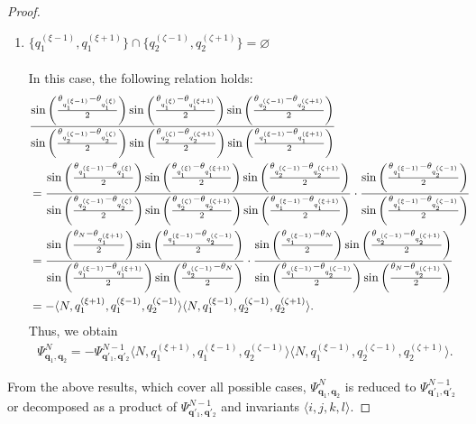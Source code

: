 \documentclass[
amsmath,amssymb,
]{revtex4-2}
\begin{document}
\begin{proof}
\begin{enumerate}
\item[\textit{Case.6:}] $\{{q_1^{(\xi-1)}},{q_1^{(\xi+1)}}\} \cap \{{q_2^{(\zeta-1)}}, {q_2^{(\zeta+1)}}\} = \varnothing$ 
\\ \\
%
In this case, the following relation holds:
\begin{align}
    &\frac{\sin\left( \frac{\theta_{q_1^{(\xi-1)}} - \theta_{q_1^{(\xi)}}}{2} \right)\sin\left( \frac{\theta_{q_1^{(\xi)}} - \theta_{q_1^{(\xi+1)}}}{2} \right)\sin\left( \frac{\theta_{q_2^{(\zeta-1)}} - \theta_{q_2^{(\zeta+1)}}}{2} \right)}
   {\sin\left( \frac{\theta_{q_2^{(\zeta-1)}} - \theta_{q_2^{(\zeta)}}}{2} \right)\sin\left( \frac{\theta_{q_2^{(\zeta)}} - \theta_{q_2^{(\zeta+1)}}}{2} \right)\sin\left( \frac{\theta_{q_1^{(\xi-1)}} - \theta_{q_1^{(\xi+1)}}}{2} \right)}\cr
    &=\frac{\sin\left( \frac{\theta_{q_1^{(\xi-1)}} - \theta_{q_1^{(\xi)}}}{2} \right)\sin\left( \frac{\theta_{q_1^{(\xi)}} - \theta_{q_1^{(\xi+1)}}}{2} \right)\sin\left( \frac{\theta_{q_2^{(\zeta-1)}} - \theta_{q_2^{(\zeta+1)}}}{2} \right)}
   {\sin\left( \frac{\theta_{q_2^{(\zeta-1)}} - \theta_{q_2^{(\zeta)}}}{2} \right)\sin\left( \frac{\theta_{q_2^{(\zeta)}} - \theta_{q_2^{(\zeta+1)}}}{2} \right)\sin\left( \frac{\theta_{q_1^{(\xi-1)}} - \theta_{q_1^{(\xi+1)}}}{2} \right)}
   \cdot \frac{\sin\left( \frac{\theta_{q_1^{(\xi-1)}} - \theta_{q_2^{(\zeta-1)}}}{2} \right)}{\sin\left( \frac{\theta_{q_1^{(\xi-1)}} - \theta_{q_2^{(\zeta-1)}}}{2} \right)}\cr
    &=\frac{\sin\left( \frac{\theta_{N} - \theta_{q_1^{(\xi+1)}}}{2} \right)\sin\left( \frac{\theta_{q_1^{(\xi-1)}} - \theta_{q_2^{(\zeta-1)}}}{2} \right)}{\sin\left( \frac{\theta_{q_1^{(\xi-1)}} - \theta_{q_1^{(\xi+1)}}}{2} \right)\sin\left( \frac{\theta_{q_2^{(\zeta-1)}} - \theta_{N}}{2} \right)}\cdot
    \frac{\sin\left( \frac{\theta_{q_1^{(\xi-1)}} - \theta_{N}}{2} \right)\sin\left( \frac{\theta_{q_2^{(\zeta-1)}} - \theta_{q_2^{(\zeta+1)}}}{2} \right)}{\sin\left( \frac{\theta_{q_1^{(\xi-1)}} - \theta_{q_2^{(\zeta-1)}}}{2} \right)\sin\left( \frac{\theta_{N} - \theta_{q_2^{(\zeta+1)}}}{2} \right)}
    \cr
    &=-\langle N, q_1^{(\xi+1)}, q_1^{(\xi-1)}, q_2^{(\zeta-1)}\rangle\langle N, q_1^{(\xi-1)}, q_2^{(\zeta-1)}, q_2^{(\zeta+1)}\rangle.
\end{align}
Thus, we obtain
\begin{align}
    \Psi^N_{\bm{q}_1, \bm{q}_2}= -\Psi^{N-1}_{\bm{q}'_1, \bm{q}'_2}
    \langle N, q_1^{(\xi+1)}, q_1^{(\xi-1)}, q_2^{(\zeta-1)}\rangle\langle N, q_1^{(\xi-1)}, q_2^{(\zeta-1)}, q_2^{(\zeta+1)}\rangle.
\end{align}
\end{enumerate}
%
From the above results, which cover all possible cases,  $\Psi^N_{\bm{q}_1, \bm{q}_2}$ is reduced to $\Psi^{N-1}_{\bm{q}'_1, \bm{q}'_2}$ or decomposed as a product of $\Psi^{N-1}_{\bm{q}'_1, \bm{q}'_2}$ and invariants $\langle  i,j,k,l\rangle$.
\end{proof}
\end{document}
